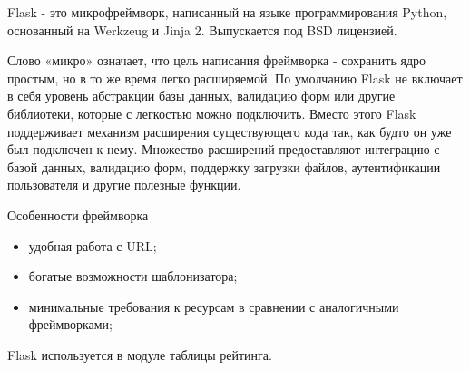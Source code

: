 Flask - это микрофреймворк, написанный на языке программирования Python, основанный на Werkzeug и Jinja 2. Выпускается под BSD лицензией.

Слово «микро» означает, что цель написания фреймворка - сохранить ядро простым, но в то же время легко расширяемой. По умолчанию Flask не включает в себя уровень абстракции базы данных, валидацию форм или другие библиотеки, которые с легкостью можно подключить. Вместо этого Flask поддерживает механизм расширения существующего кода так, как будто он уже был подключен к нему. Множество расширений предоставляют интеграцию с базой данных, валидацию форм, поддержку загрузки файлов, аутентификации пользователя и другие полезные функции.

Особенности фреймворка 
\begin{itemize}
\item удобная работа с URL;
\item богатые возможности шаблонизатора;
\item минимальные требования к ресурсам в сравнении с аналогичными фреймворками;
\end{itemize}

Flask используется в модуле таблицы рейтинга. 